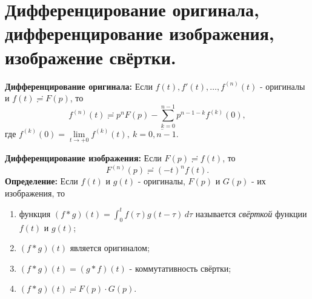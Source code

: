 \section{Дифференцирование оригинала, дифференцирование изображения,
изображение
свёртки.}\label{ux434ux438ux444ux444ux435ux440ux435ux43dux446ux438ux440ux43eux432ux430ux43dux438ux435-ux43eux440ux438ux433ux438ux43dux430ux43bux430-ux434ux438ux444ux444ux435ux440ux435ux43dux446ux438ux440ux43eux432ux430ux43dux438ux435-ux438ux437ux43eux431ux440ux430ux436ux435ux43dux438ux44f-ux438ux437ux43eux431ux440ux430ux436ux435ux43dux438ux435-ux441ux432ux451ux440ux442ux43aux438.}

\textbf{Дифференцирование оригинала:} Если
\(f(t), f'(t),\dots,f^{(n)}(t)\) - оригиналы и
\(f(t)\risingdotseq F(p)\), то \[
f^{(n)}(t)\risingdotseq p^{n}F(p)-\sum_{k=0}^{n-1}p^{n-1-k}f^{(k)}(0),
\] где
\(f^{(k)}(0)=\lim\limits_{ t \to +0 }f^{(k)}(t), \ k=\overline{0,n-1}\).

\textbf{Дифференцирование изображения:} Если \(F(p)\risingdotseq f(t)\),
то \[
F^{(n)}(p)\risingdotseq(-t)^{n}f(t).
\] \textbf{Определение:} Если \(f(t)\) и \(g(t)\) - оригиналы, \(F(p)\)
и \(G(p)\) - их изображения, то

\begin{enumerate}
\def\labelenumi{\arabic{enumi}.}
\tightlist
\item
  функция \((f*g)(t)=\int_{0}^{t}f(\tau)g(t-\tau)\,d\tau\) называется
  \emph{свёрткой} функции \(f(t)\) и \(g(t)\);
\item
  \((f*g)(t)\) является оригиналом;
\item
  \((f*g)(t)=(g*f)(t)\) - коммутативность свёртки;
\item
  \((f*g)(t)\risingdotseq F(p)\cdot G(p)\).
\end{enumerate}
